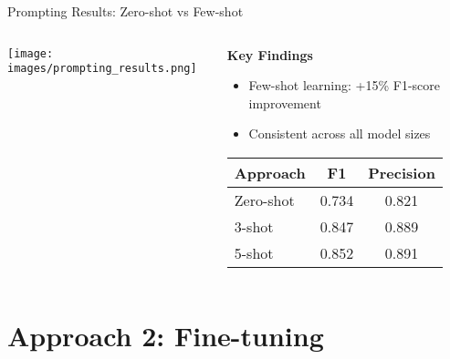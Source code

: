 \documentclass[aspectratio=169]{beamer}
\begin{document}
\begin{frame}{Prompting Results: Zero-shot vs Few-shot}
\begin{columns}
\begin{column}{0.6\textwidth}
\begin{center}
\texttt{[image: images/prompting\_results.png]}
\end{center}
\end{column}
\begin{column}{0.4\textwidth}
\textbf{Key Findings}
\begin{itemize}
\item Few-shot learning: +15\% F1-score improvement
\item Consistent across all model sizes
\end{itemize}

\vspace{0.3cm}
\begin{table}[h]
\centering
\scriptsize
\begin{tabular}{lcc}
\toprule
\textbf{Approach} & \textbf{F1} & \textbf{Precision} \\
\midrule
Zero-shot & 0.734 & 0.821 \\
3-shot & 0.847 & 0.889 \\
5-shot & 0.852 & 0.891 \\
\bottomrule
\end{tabular}
\end{table}
\end{column}
\end{columns}
\end{frame}

\section{Approach 2: Fine-tuning}
\end{document}
